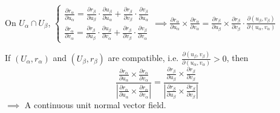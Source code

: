 On $U_\alpha\cap U_\beta$, $\begin{cases}
        \frac{\partial r_\alpha}{\partial u_\alpha}=\frac{\partial r_\beta}{\partial u_\beta}\cdot\frac{\partial u_\beta}{\partial u_\alpha}+\frac{\partial r_\beta}{\partial v_\beta}\cdot\frac{\partial v_\beta}{\partial u_\alpha} \\
        \frac{\partial r_\alpha}{\partial v_\alpha}=\frac{\partial r_\beta}{\partial u_\beta}\cdot\frac{\partial u_\beta}{\partial v_\alpha}+\frac{\partial r_\beta}{\partial v_\beta}\cdot\frac{\partial v_\beta}{\partial v_\alpha}
    \end{cases}\implies\frac{\partial r_\alpha}{\partial u_\alpha}\times\frac{\partial r_\alpha}{\partial v_\alpha}=\frac{\partial r_\beta}{\partial u_\beta}\times\frac{\partial r_\beta}{\partial v_\beta}\cdot\frac{\partial(u_\beta,v_\beta)}{\partial(u_\alpha,v_\alpha)}$

If $(U_\alpha,r_\alpha)$ and $(U_\beta,r_\beta)$ are compatible, i.e. $\frac{\partial(u_\beta,v_\beta)}{\partial(u_\alpha,v_\alpha)}>0$, then
$$\frac{\frac{\partial r_\alpha}{\partial u_\alpha}\times\frac{\partial r_\alpha}{\partial v_\alpha}}{\left|\frac{\partial r_\alpha}{\partial u_\alpha}\times\frac{\partial r_\alpha}{\partial v_\alpha}\right|}=\frac{\frac{\partial r_\beta}{\partial u_\beta}\times\frac{\partial r_\beta}{\partial v_\beta}}{\left|\frac{\partial r_\beta}{\partial u_\beta}\times\frac{\partial r_\beta}{\partial v_\beta}\right|}$$
$\implies$ A continuous unit normal vector field.



